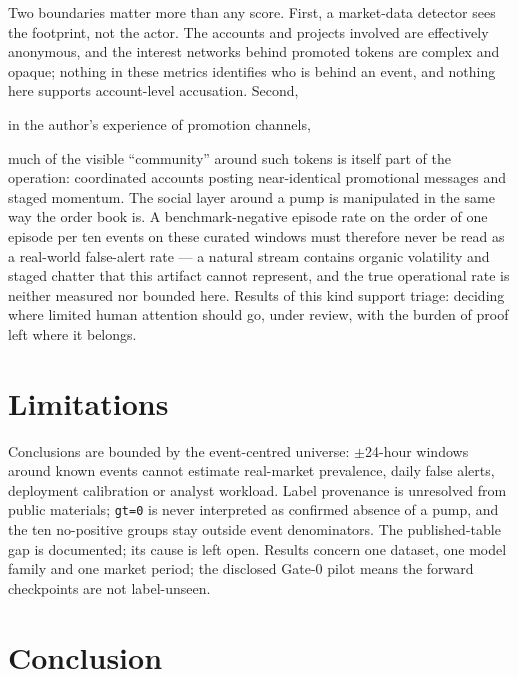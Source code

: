 \documentclass[runningheads]{llncs}
\newif\ifneutralpositionality
\begin{document}
Two boundaries matter more than any score. First, a market-data
detector sees the footprint, not the actor. The accounts and projects
involved are effectively anonymous, and the interest networks behind
promoted tokens are complex and opaque; nothing in these metrics
identifies who is behind an event, and nothing here supports
account-level accusation. Second,
\ifneutralpositionality
in the author's assessment of promotion channels,
\else
in the author's experience of promotion channels,
\fi
much of the visible ``community'' around such tokens is itself part of
the operation: coordinated accounts posting near-identical promotional
messages and staged momentum. The social layer around a pump is
manipulated in the same way the order book is. A benchmark-negative
episode rate on the order of one episode per ten events on these
curated windows must therefore never be read as a real-world
false-alert rate --- a natural stream contains organic volatility and
staged chatter that this artifact cannot represent, and the true
operational rate is neither measured nor bounded here. Results of this
kind support triage: deciding where limited human attention should go,
under review, with the burden of proof left where it belongs.

\section{Limitations}\label{sec:limitations}

Conclusions are bounded by the event-centred universe: $\pm$24-hour
windows around known events cannot estimate real-market prevalence,
daily false alerts, deployment calibration or analyst workload. Label
provenance is unresolved from public materials; \texttt{gt=0} is never
interpreted as confirmed absence of a pump, and the ten no-positive
groups stay outside event denominators. The published-table gap is
documented; its cause is left open. Results concern one dataset, one
model family and one market period; the disclosed Gate-0 pilot means
the forward checkpoints are not label-unseen.

\section{Conclusion}\label{sec:conclusion}
\end{document}
